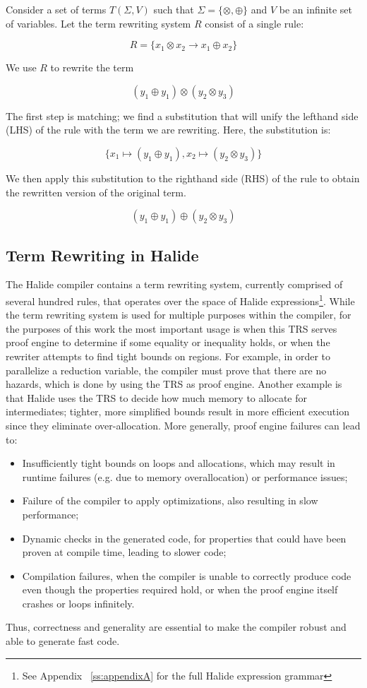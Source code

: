 \documentclass[sigplan,review,anonymous]{acmart}\settopmatter{printfolios=true,printccs=false,printacmref=false}
\begin{document}
Consider a set of terms $T(\Sigma, V)$ such that $\Sigma = \{\otimes, \oplus\}$ and $V$ be an infinite set of variables. Let the term rewriting system $R$ consist of a single rule:

\[ R = \{ x_1 \otimes x_2 \rightarrow x_1 \oplus x_2 \} \]

We use $R$ to rewrite the term

\[ 
(y_1 \oplus y_1) \otimes (y_2 \otimes y_3)
\]

The first step is matching; we find a substitution that will unify the lefthand side (LHS) of the rule with the term we are rewriting. Here, the substitution is:

\[
\{ x_1 \mapsto (y_1 \oplus y_1), x_2 \mapsto (y_2 \otimes y_3) \}
\]

We then apply this substitution to the righthand side (RHS) of the rule to obtain the rewritten version of the original term.

\[ 
(y_1 \oplus y_1) \oplus (y_2 \otimes y_3)
\]

\subsection{Term Rewriting in Halide}

The Halide compiler contains a term rewriting system, currently comprised of
several hundred rules, that operates over the space of Halide
expressions\footnote{See Appendix ~\ref{ss:appendixA} for the full Halide
  expression grammar}. While the term rewriting system is used for multiple
purposes within the compiler, for the purposes of this work the most important
usage is when this TRS serves proof engine to determine if
some equality or inequality holds, or when the rewriter attempts to find tight
bounds on regions. For example, in order to parallelize a
reduction variable, the compiler must prove that there are no hazards, which is
done by using the TRS as proof engine.  Another example is that Halide uses
the TRS to decide how much memory to allocate for intermediates; tighter, more
simplified bounds result in more efficient execution since they eliminate over-allocation.
More generally, proof engine failures can lead to:
\begin{itemize}
\item Insufficiently tight bounds on loops and allocations, which may result in
  runtime failures (e.g. due to memory overallocation) or performance issues;

\item Failure of the compiler to apply optimizations, also resulting in slow performance;

\item Dynamic checks in the generated code, for properties that could have been proven
  at compile time, leading to slower code;

\item Compilation failures, when the compiler is unable to correctly produce code
  even though the properties required hold, or when the proof engine itself crashes
  or loops infinitely.
\end{itemize}
Thus, correctness and generality are essential to make the compiler robust and
able to generate fast code.
\end{document}
